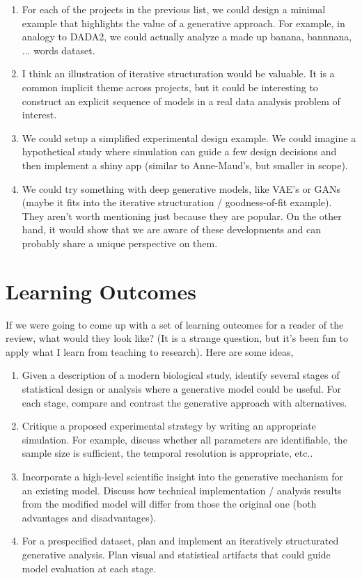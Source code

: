 \documentclass[]{article}
\begin{document}
\begin{enumerate}
\item For each of the projects in the previous list, we could design a minimal example that highlights the value of a generative approach. For example, in analogy to DADA2, we could actually analyze a made up banana, bannnana, ... words dataset.
\item I think an illustration of iterative structuration would be valuable. It is a common implicit theme across projects, but it could be interesting to construct an explicit sequence of models in a real data analysis problem of interest.
\item We could setup a simplified experimental design example. We could imagine a hypothetical study where simulation can guide a few design decisions and then implement a shiny app (similar to Anne-Maud's, but smaller in scope).
\item We could try something with deep generative models, like VAE’s or GANs (maybe it fits into the iterative structuration / goodness-of-fit example). They aren’t worth mentioning just because they are popular. On the other hand, it would show that we are aware of these developments and can probably share a unique perspective on them.
\end{enumerate}

\section{Learning Outcomes}

If we were going to come up with a set of learning outcomes for a reader of the review, what would they look like? (It is a strange question, but it's been fun to apply what I learn from teaching to research). Here are some ideas,

\begin{enumerate}
\item Given a description of a modern biological study, identify several stages of statistical design or analysis where a generative model could be useful. For each stage, compare and contrast the generative approach with alternatives.
\item Critique a proposed experimental strategy by writing an appropriate simulation. For example, discuss whether all parameters are identifiable,  the sample size is sufficient, the temporal resolution is appropriate, etc..
\item Incorporate a high-level scientific insight into the generative mechanism for an existing model. Discuss how technical implementation / analysis results from the modified model will differ from those the original one (both advantages and disadvantages).
\item For a prespecified dataset, plan and implement an iteratively structurated generative analysis. Plan visual and statistical artifacts that could guide model evaluation at each stage.
\end{enumerate}
\end{document}
